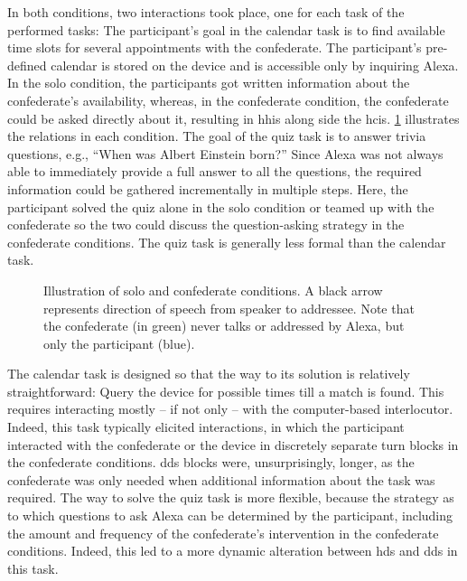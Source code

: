 In both conditions, two interactions took place, one for each task of the performed tasks:
The participant's goal in the calendar task is to find available time slots for several appointments with the confederate.
The participant's pre-defined calendar is stored on the device and is accessible only by inquiring Alexa.
In the solo condition, the participants got written information about the confederate's availability, whereas, in the confederate condition, the confederate could be asked directly about it, resulting in \acp{hhi} along side the \acp{hci}.
\cref{fig:conditions_comparison} illustrates the relations in each condition.
The goal of the quiz task is to answer trivia questions, e.g., \enquote{When was Albert Einstein born?}
Since Alexa was not always able to immediately provide a full answer to all the questions, the required information could be gathered incrementally in multiple steps.
Here, the participant solved the quiz alone in the solo condition or teamed up with the confederate so the two could discuss the question-asking strategy in the confederate conditions.
The quiz task is generally less formal than the calendar task.
%
\begin{figure}[t]
	\centering
	\hfill
	\caption[Solo and confederate conditions in \acs{hhci} setting]
		{Illustration of solo and confederate conditions.
		A black arrow represents direction of speech from speaker to addressee.
		Note that the confederate (in green) never talks or addressed by Alexa, but only the participant (blue).}
	\label{fig:conditions_comparison}
\end{figure}
%
The calendar task is designed so that the way to its solution is relatively straightforward:
Query the device for possible times till a match is found.
This requires interacting mostly -- if not only -- with the computer-based interlocutor.
Indeed, this task typically elicited interactions, in which the participant interacted with the confederate or the device in discretely separate turn blocks in the confederate conditions.
\ac{dds} blocks were, unsurprisingly, longer, as the confederate was only needed when additional information about the task was required.
The way to solve the quiz task is more flexible, because the strategy as to which questions to ask Alexa can be determined by the participant, including the amount and frequency of the confederate's intervention in the confederate conditions.
Indeed, this led to a more dynamic alteration between \ac{hds} and \ac{dds} in this task.

